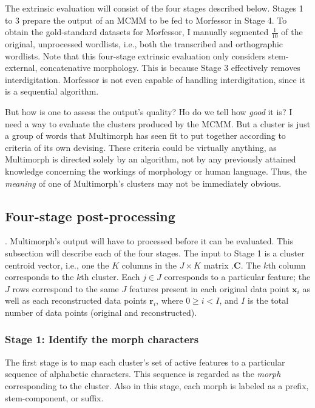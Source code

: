 The extrinsic evaluation will consist of the four stages described below. 
Stages 1 to 3 prepare the output of an MCMM to be fed to Morfessor in Stage 4. 
To obtain the gold-standard datasets for Morfessor, I manually segmented 
$\frac{1}{10}$ of the original, unprocessed wordlists, i.e., both the transcribed 
and orthographic wordlists. Note that this four-stage extrinsic evaluation only considers 
stem-external, concatenative morphology. This is because Stage 3 effectively removes 
interdigitation. Morfessor is not even capable of handling interdigitation, since it is 
a sequential algorithm.

But how is one to assess the output's quality? Ho do we tell how \emph{good} it is? I need a way to evaluate the clusters produced by the MCMM.
But a cluster is just a group of words that Multimorph has seen fit to put together according to criteria of its own devising.
These criteria could be virtually anything, as Multimorph is directed solely by an algorithm, not by any previously attained knowledge concerning
the workings of morphology or human language. 
Thus, the \emph{meaning} of one of Multimorph's clusters may not be immediately obvious.
 
 
\subsection{Four-stage post-processing} \label{sec:extrinsic}. Multimorph's output 
will have to processed before it can be evaluated. This subsection 
will describe each of the four stages. The input to Stage 1 is a cluster centroid vector, 
i.e., one the $K$ columns in the $J \times K$ matrix $.\mathbf{C}$. The $k$th column 
corresponds to the $k$th cluster. Each $j \in J$ corresponds to a particular feature; the 
$J$ rows correspond to the same $J$ features present in each original data point 
$\mathbf{x}_{i}$ as well as each reconstructed data points $\mathbf{r}_{i}$, where 
$0 \ge i < I$, and $I$ is the total number of data points (original and reconstructed).

\subsubsection{Stage 1: Identify the morph characters} The first stage is to map each cluster's set of active features to a particular sequence of alphabetic characters. This sequence is regarded as the \emph{morph} corresponding to the cluster. Also in this stage, each morph is labeled as a prefix, stem-component, or suffix.

